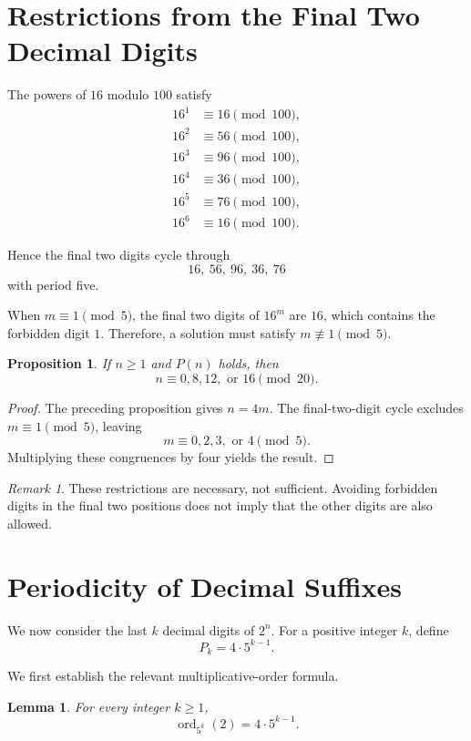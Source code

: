 \documentclass[11pt,a4paper]{article}
\theoremstyle{definition}
\theoremstyle{plain}
\newtheorem{lemma}[definition]{Lemma}
\newtheorem{proposition}[definition]{Proposition}
\theoremstyle{remark}
\newtheorem{remark}[definition]{Remark}
\begin{document}
\section{Restrictions from the Final Two Decimal Digits}

The powers of \(16\) modulo \(100\) satisfy
\[
\begin{aligned}
16^1&\equiv16\pmod{100},\\
16^2&\equiv56\pmod{100},\\
16^3&\equiv96\pmod{100},\\
16^4&\equiv36\pmod{100},\\
16^5&\equiv76\pmod{100},\\
16^6&\equiv16\pmod{100}.
\end{aligned}
\]

Hence the final two digits cycle through
\[
16,\ 56,\ 96,\ 36,\ 76
\]
with period five.

When \(m\equiv 1\pmod 5\), the final two digits of \(16^m\)
are \(16\), which contains the forbidden digit \(1\). Therefore,
a solution must satisfy \(m\not\equiv 1\pmod 5\).

\begin{proposition}
If \(n\geq 1\) and \(P(n)\) holds, then
\[
n\equiv 0,8,12,\text{ or }16\pmod{20}.
\]
\end{proposition}

\begin{proof}
The preceding proposition gives \(n=4m\). The final-two-digit
cycle excludes \(m\equiv 1\pmod 5\), leaving
\[
m\equiv 0,2,3,\text{ or }4\pmod 5.
\]
Multiplying these congruences by four yields the result.
\end{proof}

\begin{remark}
These restrictions are necessary, not sufficient. Avoiding
forbidden digits in the final two positions does not imply that
the other digits are also allowed.
\end{remark}

\section{Periodicity of Decimal Suffixes}

We now consider the last \(k\) decimal digits of \(2^n\).
For a positive integer \(k\), define
\[
P_k=4\cdot 5^{k-1}.
\]

We first establish the relevant multiplicative-order formula.

\begin{lemma}
For every integer \(k\geq 1\),
\[
\operatorname{ord}_{5^k}(2)=4\cdot 5^{k-1}.
\]
\end{lemma}
\end{document}
